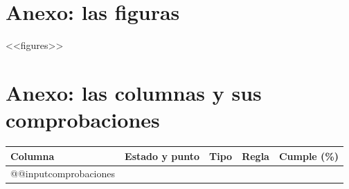 \clearpage
\appendix
\section{Anexo: las figuras}\label{sec:figures}
<<figures>>

\clearpage
\section{Anexo: las columnas y sus comprobaciones}\label{sec:columns}\label{sec:checks}
\begin{small}
\setlength{\tabcolsep}{4pt}
\begin{longtable}{@{}>{\raggedright\arraybackslash}p{3.7cm}>{\raggedright\arraybackslash}p{3.4cm}>{\raggedright\arraybackslash}p{1.9cm}>{\raggedright\arraybackslash}p{4.0cm}r@{}}
\toprule
Columna & Estado y punto & Tipo & Regla & Cumple (\%)\\
\midrule
\endhead
\bottomrule
\endfoot
\csname @@input\endcsname comprobaciones   %
\end{longtable}
\end{small}


